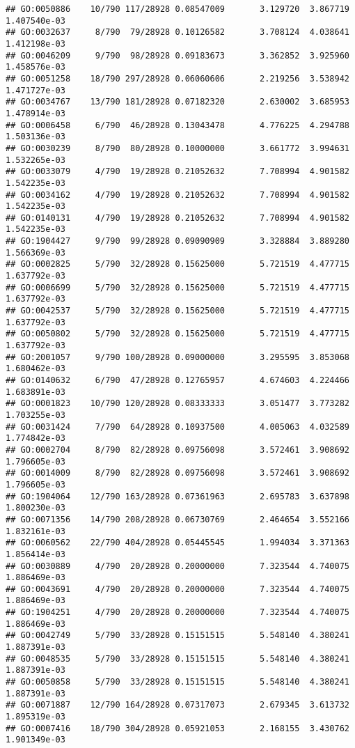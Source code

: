 \documentclass[
]{article}
\begin{document}
\begin{verbatim}
## GO:0050886    10/790 117/28928 0.08547009       3.129720  3.867719 1.407540e-03
## GO:0032637     8/790  79/28928 0.10126582       3.708124  4.038641 1.412198e-03
## GO:0046209     9/790  98/28928 0.09183673       3.362852  3.925960 1.458576e-03
## GO:0051258    18/790 297/28928 0.06060606       2.219256  3.538942 1.471727e-03
## GO:0034767    13/790 181/28928 0.07182320       2.630002  3.685953 1.478914e-03
## GO:0006458     6/790  46/28928 0.13043478       4.776225  4.294788 1.503136e-03
## GO:0030239     8/790  80/28928 0.10000000       3.661772  3.994631 1.532265e-03
## GO:0033079     4/790  19/28928 0.21052632       7.708994  4.901582 1.542235e-03
## GO:0034162     4/790  19/28928 0.21052632       7.708994  4.901582 1.542235e-03
## GO:0140131     4/790  19/28928 0.21052632       7.708994  4.901582 1.542235e-03
## GO:1904427     9/790  99/28928 0.09090909       3.328884  3.889280 1.566369e-03
## GO:0002825     5/790  32/28928 0.15625000       5.721519  4.477715 1.637792e-03
## GO:0006699     5/790  32/28928 0.15625000       5.721519  4.477715 1.637792e-03
## GO:0042537     5/790  32/28928 0.15625000       5.721519  4.477715 1.637792e-03
## GO:0050802     5/790  32/28928 0.15625000       5.721519  4.477715 1.637792e-03
## GO:2001057     9/790 100/28928 0.09000000       3.295595  3.853068 1.680462e-03
## GO:0140632     6/790  47/28928 0.12765957       4.674603  4.224466 1.683891e-03
## GO:0001823    10/790 120/28928 0.08333333       3.051477  3.773282 1.703255e-03
## GO:0031424     7/790  64/28928 0.10937500       4.005063  4.032589 1.774842e-03
## GO:0002704     8/790  82/28928 0.09756098       3.572461  3.908692 1.796605e-03
## GO:0014009     8/790  82/28928 0.09756098       3.572461  3.908692 1.796605e-03
## GO:1904064    12/790 163/28928 0.07361963       2.695783  3.637898 1.800230e-03
## GO:0071356    14/790 208/28928 0.06730769       2.464654  3.552166 1.832161e-03
## GO:0060562    22/790 404/28928 0.05445545       1.994034  3.371363 1.856414e-03
## GO:0030889     4/790  20/28928 0.20000000       7.323544  4.740075 1.886469e-03
## GO:0043691     4/790  20/28928 0.20000000       7.323544  4.740075 1.886469e-03
## GO:1904251     4/790  20/28928 0.20000000       7.323544  4.740075 1.886469e-03
## GO:0042749     5/790  33/28928 0.15151515       5.548140  4.380241 1.887391e-03
## GO:0048535     5/790  33/28928 0.15151515       5.548140  4.380241 1.887391e-03
## GO:0050858     5/790  33/28928 0.15151515       5.548140  4.380241 1.887391e-03
## GO:0071887    12/790 164/28928 0.07317073       2.679345  3.613732 1.895319e-03
## GO:0007416    18/790 304/28928 0.05921053       2.168155  3.430762 1.901349e-03

\end{verbatim}
\end{document}

